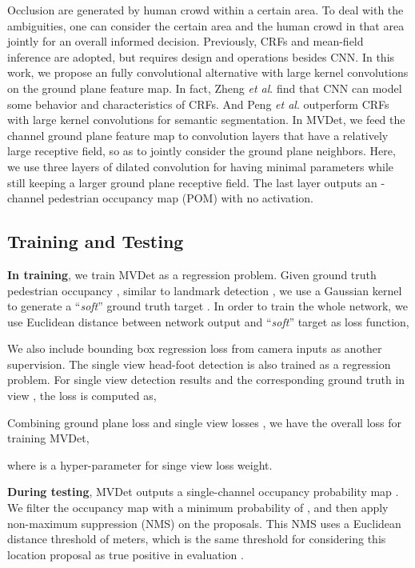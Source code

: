 \documentclass[runningheads]{llncs}
\newcommand{\etal}{\textit{et al}. }
\begin{document}
Occlusion are generated by human crowd within a certain area. To deal with the ambiguities, one can consider the certain area and the human crowd in that area jointly for an overall informed decision. 
Previously, CRFs and mean-field inference are adopted, but requires design and operations besides CNN. In this work, we propose an fully convolutional alternative with large kernel convolutions on the ground plane feature map. In fact, Zheng \etal \cite{zheng2015conditional} find that CNN can model some behavior and characteristics of CRFs. And Peng \etal \cite{peng2017large} outperform CRFs with large kernel convolutions for semantic segmentation. 
In MVDet, we feed the  channel ground plane feature map to convolution layers that have a relatively large receptive field, so as to jointly consider the ground plane neighbors. 
Here, we use three layers of dilated convolution for having minimal parameters while still keeping a larger ground plane receptive field. 
The last layer outputs an -channel  pedestrian occupancy map (POM)  with no activation. 


\subsection{Training and Testing}
\label{sec:sec:training}
\textbf{In training}, we train MVDet as a regression problem. Given ground truth pedestrian occupancy , similar to landmark detection \cite{cao2017realtime}, we use a Gaussian kernel  to generate a ``\textit{soft}'' ground truth target . In order to train the whole network, we use Euclidean distance  between network output  and ``\textit{soft}'' target  as loss function,

We also include bounding box regression loss from  camera inputs as another supervision. The single view head-foot detection is also trained as a regression problem. For single view detection results  and the corresponding ground truth  in view , the loss is computed as,

Combining ground plane loss  and  single view losses , we have the overall loss for training MVDet,

where  is a hyper-parameter for singe view loss weight.

\textbf{During testing}, MVDet outputs a single-channel occupancy probability map . We filter the occupancy map with a minimum probability of , and then apply non-maximum suppression (NMS) on the proposals. This NMS uses a Euclidean distance threshold of  meters, which is the same threshold for considering this location proposal as true positive in evaluation \cite{chavdarova2018wildtrack}. 
\end{document}
